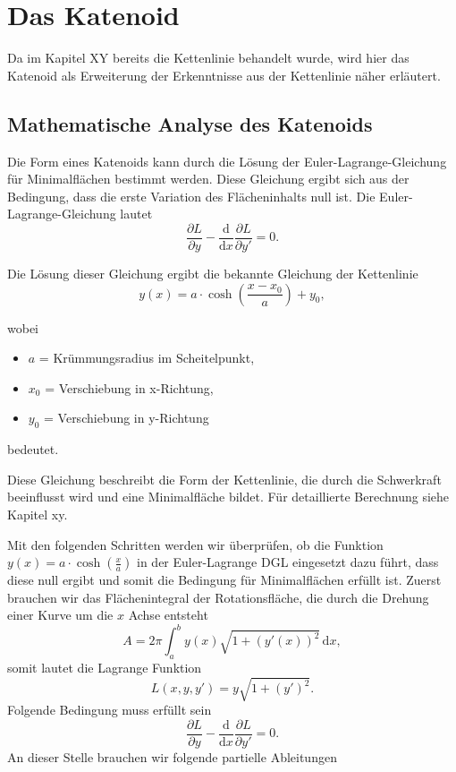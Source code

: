 %
%
%
%
\section{Das Katenoid
	\label{minimalflaechen:section:Das Katenoid}}
Da im Kapitel XY bereits die Kettenlinie behandelt wurde, wird hier das Katenoid als Erweiterung der Erkenntnisse aus der Kettenlinie näher erläutert. 

\subsection{Mathematische Analyse des Katenoids
	\label{Das Katenoid:subsection:Mathematische Analyse des Katenoids}}
Die Form eines Katenoids kann durch die Lösung der Euler-Lagrange-Gleichung für Minimalflächen bestimmt werden.
Diese Gleichung ergibt sich aus der Bedingung, dass die erste Variation des Flächeninhalts null ist.
Die Euler-Lagrange-Gleichung lautet
\begin{equation}
	\frac{\partial L}{\partial y} - \frac{\mathrm{d}}{\mathrm{d}x} \frac{\partial L}{\partial y'} = 0.
\end{equation}

Die Lösung dieser Gleichung ergibt die bekannte Gleichung der Kettenlinie
\begin{equation}
	y(x) = a \cdot \cosh \left( \frac{x - x_0}{a} \right) + y_0,
\end{equation}

wobei
\begin{itemize}
	\item \(a\) = Krümmungsradius im Scheitelpunkt,
	\item \(x_0\) = Verschiebung in x-Richtung,
	\item \(y_0\) = Verschiebung in y-Richtung
\end{itemize}
bedeutet.

Diese Gleichung beschreibt die Form der Kettenlinie, die durch die Schwerkraft beeinflusst wird und eine Minimalfläche bildet.
Für detaillierte Berechnung siehe Kapitel xy.

Mit den folgenden Schritten werden wir überprüfen, ob die Funktion  \( y(x) = a \cdot \cosh \left( \frac{x}{a} \right) \)
in der Euler-Lagrange DGL eingesetzt dazu führt, dass diese null ergibt und somit die Bedingung für Minimalflächen erfüllt ist.
Zuerst brauchen wir das Flächenintegral der Rotationsfläche, die durch die Drehung einer Kurve um die $x$ Achse entsteht
\begin{equation}
	A = 2\pi \int_{a}^{b} y(x) \sqrt{1 + (y'(x))^2} \, \mathrm{d}x, 
\end{equation}
somit lautet die Lagrange Funktion 
\begin{equation}
	L(x, y, y') = y \sqrt{1 + (y')^2}.	
\end{equation}
Folgende Bedingung muss erfüllt sein 
\begin{equation}
	\frac{\partial L}{\partial y} - \frac{\mathrm{d}}{\mathrm{d}x} \frac{\partial L}{\partial y'} = 0.
\end{equation}
An dieser Stelle brauchen wir folgende partielle Ableitungen

